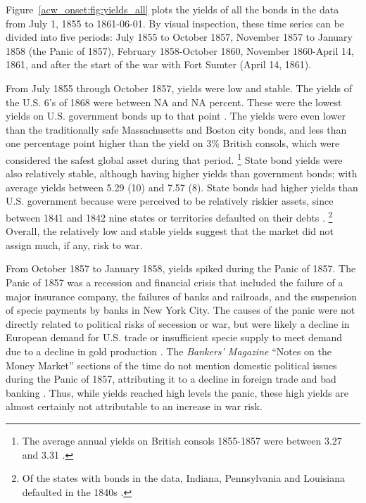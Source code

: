 Figure~\ref{acw_onset:fig:yields_all} plots the yields of all the bonds in the data from July  1, 1855 to 1861-06-01.
By visual inspection, these time series can be divided into five periods:
July 1855 to October 1857,
November 1857 to January 1858 (the Panic of 1857),
February 1858-October 1860,
November 1860-April 14, 1861,
and after the start of the war with Fort Sumter (April 14, 1861).


From July 1855 through October 1857, yields were low and stable.
The yields of the U.S. 6's of 1868 were between NA and NA percent.
These were the lowest yields on U.S. government bonds up to that point \parencite[282-283]{HomerSylla2005}.
The yields were even lower than the traditionally safe Massachusetts and Boston city bonds, and less than one percentage point higher than the yield on 3\% British consols, which were considered the safest global asset during that period.%
\footnote{The average annual yields on British consols 1855-1857 were between 3.27 and 3.31 \parencite[193]{HomerSylla2005}.}
State bond yields were also relatively stable, although having higher yields than government bonds; with average yields between 5.29 (10) and 7.57 (8).
State bonds had higher yields than U.S. government because were perceived to be relatively riskier assets, since between 1841 and 1842 nine states or territories defaulted on their debts \parencite{English1996}.%
\footnote{Of the states with bonds in the data, Indiana, Pennsylvania and Louisiana defaulted in the 1840s \parencite[265]{English1996}.}
Overall, the relatively low and stable yields suggest that the market did not assign much, if any, risk to war.

From October 1857 to January 1858, yields spiked during the Panic of 1857.
The Panic of 1857 was a recession and financial crisis that included the failure of a major insurance company, the failures of banks and railroads, and the suspension of specie payments by banks in New York City.
The causes of the panic were not directly related to political risks of secession or war, but were likely a decline in European demand for U.S. trade or insufficient specie supply to meet demand due to a decline in gold production \parencites[263-265]{Dewey1918}[277,299]{HomerSylla2005}[337]{BankersMagazine1857}.
The \textit{Bankers' Magazine} ``Notes on the Money Market'' sections of the time do not mention domestic political issues during the Panic of 1857, attributing it to a decline in foreign trade and bad banking \parencite[337]{BankersMagazine1857}.
Thus, while yields reached high levels the panic, these high yields are almost certainly not attributable to an increase in war risk.

